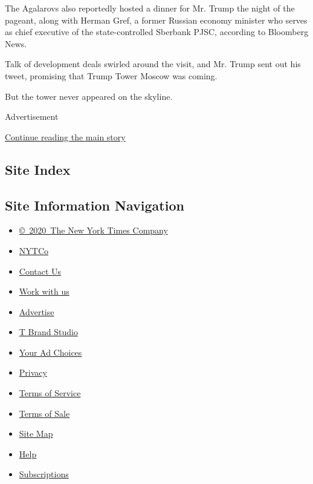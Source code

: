 The Agalarovs also reportedly hosted a dinner for Mr. Trump the night of
the pageant, along with Herman Gref, a former Russian economy minister
who serves as chief executive of the state-controlled Sberbank PJSC,
according to Bloomberg News.

Talk of development deals swirled around the visit, and Mr. Trump sent
out his tweet, promising that Trump Tower Moscow was coming.

But the tower never appeared on the skyline.

Advertisement

\protect\hyperlink{after-bottom}{Continue reading the main story}

\hypertarget{site-index}{%
\subsection{Site Index}\label{site-index}}

\hypertarget{site-information-navigation}{%
\subsection{Site Information
Navigation}\label{site-information-navigation}}

\begin{itemize}
\tightlist
\item
  \href{https://help.nytimes.com/hc/en-us/articles/115014792127-Copyright-notice}{©~2020~The
  New York Times Company}
\end{itemize}

\begin{itemize}
\tightlist
\item
  \href{https://www.nytco.com/}{NYTCo}
\item
  \href{https://help.nytimes.com/hc/en-us/articles/115015385887-Contact-Us}{Contact
  Us}
\item
  \href{https://www.nytco.com/careers/}{Work with us}
\item
  \href{https://nytmediakit.com/}{Advertise}
\item
  \href{http://www.tbrandstudio.com/}{T Brand Studio}
\item
  \href{https://www.nytimes.com/privacy/cookie-policy\#how-do-i-manage-trackers}{Your
  Ad Choices}
\item
  \href{https://www.nytimes.com/privacy}{Privacy}
\item
  \href{https://help.nytimes.com/hc/en-us/articles/115014893428-Terms-of-service}{Terms
  of Service}
\item
  \href{https://help.nytimes.com/hc/en-us/articles/115014893968-Terms-of-sale}{Terms
  of Sale}
\item
  \href{https://spiderbites.nytimes.com}{Site Map}
\item
  \href{https://help.nytimes.com/hc/en-us}{Help}
\item
  \href{https://www.nytimes.com/subscription?campaignId=37WXW}{Subscriptions}
\end{itemize}
